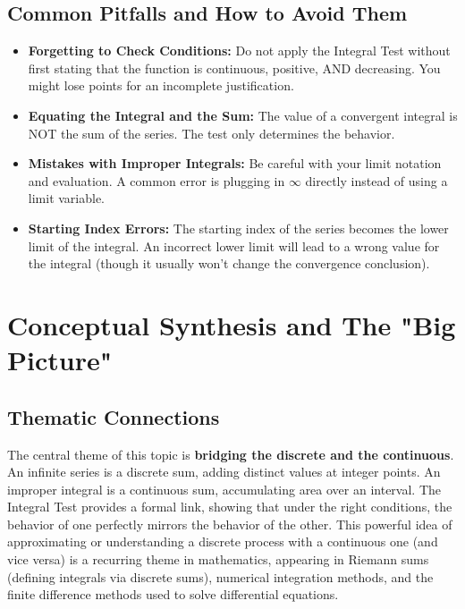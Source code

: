 \documentclass{article}
\begin{document}
\subsection{Common Pitfalls and How to Avoid Them}
\begin{itemize}
    \item \textbf{Forgetting to Check Conditions:} Do not apply the Integral Test without first stating that the function is continuous, positive, AND decreasing. You might lose points for an incomplete justification.
    \item \textbf{Equating the Integral and the Sum:} The value of a convergent integral is NOT the sum of the series. The test only determines the behavior.
    \item \textbf{Mistakes with Improper Integrals:} Be careful with your limit notation and evaluation. A common error is plugging in $\infty$ directly instead of using a limit variable.
    \item \textbf{Starting Index Errors:} The starting index of the series becomes the lower limit of the integral. An incorrect lower limit will lead to a wrong value for the integral (though it usually won't change the convergence conclusion).
\end{itemize}

\section{Conceptual Synthesis and The "Big Picture"}

\subsection{Thematic Connections}
The central theme of this topic is \textbf{bridging the discrete and the continuous}. An infinite series is a discrete sum, adding distinct values at integer points. An improper integral is a continuous sum, accumulating area over an interval. The Integral Test provides a formal link, showing that under the right conditions, the behavior of one perfectly mirrors the behavior of the other. This powerful idea of approximating or understanding a discrete process with a continuous one (and vice versa) is a recurring theme in mathematics, appearing in Riemann sums (defining integrals via discrete sums), numerical integration methods, and the finite difference methods used to solve differential equations.
\end{document}
